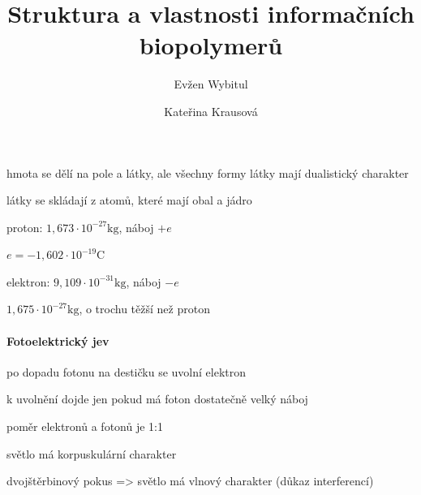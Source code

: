 \documentclass[DIV=8]{scrreprt}
\title{Struktura a vlastnosti informačních biopolymerů}
\author{Evžen Wybitul \and Kateřina Krausová}
\begin{document}
\begin{titlepage}
\maketitle
\end{titlepage}
\tableofcontents



\begin{myItemize}[nosep]
    \item hmota se dělí na pole a látky, ale všechny formy látky mají dualistický charakter
    \item látky se skládají z atomů, které mají obal a jádro
\begin{myItemize}[nosep]
    \item proton: \(1,673 \cdot 10^{-27} \text{kg}\), náboj \(+e\)
\begin{myItemize}[nosep]
    \item \(e = -1,602 \cdot 10^{-19} \text{C}\)
\end{myItemize}

    \item elektron: \(9,109 \cdot 10^{-31} \text{kg}\), náboj \(-e\)
    \item \(1,675 \cdot 10^{-27} \text{kg}\), o trochu těžší než proton
\end{myItemize}

\end{myItemize}




\paragraph{Fotoelektrický jev}
\begin{myItemize}[nosep]
    \item po dopadu fotonu na destičku se uvolní elektron
    \item k uvolnění dojde jen pokud má foton dostatečně velký náboj
    \item poměr elektronů a fotonů je 1:1
    \item světlo má korpuskulární charakter
\begin{myItemize}[nosep]
    \item dvojštěrbinový pokus => světlo má vlnový charakter (důkaz interferencí)
\end{myItemize}

\end{myItemize}
\end{document}
